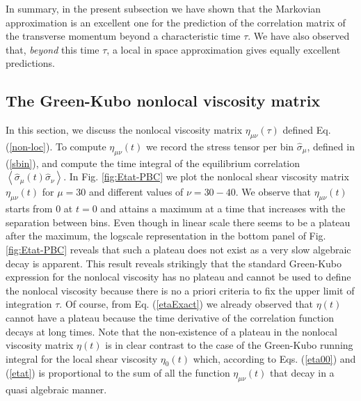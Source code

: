 \documentclass[a4paper,openright,12pt]{book}
\newcommand{\llangle}{\left\langle}
\newcommand{\rrangle}{\right\rangle}
\begin{document}
In summary, in the present subsection we have shown that the Markovian
approximation  is  an   excellent  one  for  the   prediction  of  the
correlation matrix of the  transverse momentum beyond a characteristic
time $\tau$.   We have also  observed that, \textit{beyond}  this time
$\tau$,  a  local  in  space  approximation  gives  equally  excellent
predictions.




\subsection{The Green-Kubo nonlocal viscosity matrix}
In   this  section,   we  discuss   the  nonlocal   viscosity  matrix
$\eta_{\mu\nu}(\tau)$  defined   Eq.   (\ref{non-loc}).    To  compute
$\eta_{\mu\nu}(t)$   we    record   the   stress   tensor    per   bin
$\hat{\sigma}_\mu$,  defined in  (\ref{sbin}),  and  compute the  time
integral     of     the      equilibrium     correlation     $\llangle
\hat{\sigma}_{\mu}(t)\hat{\sigma}_\nu\rrangle$.         In        Fig.
\ref{fig:Etat-PBC}  we  plot  the nonlocal  shear  viscosity
matrix  $\eta_{\mu\nu}(t)$  for  $\mu=30$   and  different  values  of
$\nu=30-40$.   We observe  that  $\eta_{\mu\nu}(t)$ starts  from 0  at
$t=0$  and  attains a  maximum  at  a  time  that increases  with  the
separation between bins. Even though in linear scale there seems to be
a plateau after the maximum, the logscale representation in the bottom
panel of Fig.  \ref{fig:Etat-PBC} reveals that such a plateau
does  not exist  as a  very slow  algebraic decay  is apparent.   This
result reveals strikingly that  the standard Green-Kubo expression for
the nonlocal  viscosity has no plateau  and cannot be used  to define
the nonlocal viscosity  because there is no a priori  criteria to fix
the  upper  limit   of  integration  $\tau$.   Of   course,  from  Eq.
(\ref{etaExact})  we already  observed  that $\eta(t)$  cannot have  a
plateau because the time derivative of the correlation function decays
at  long times.   Note  that the  non-existence of  a  plateau in  the
nonlocal viscosity matrix $\eta(t)$ is  in clear contrast to the case
of  the Green-Kubo  running  integral for  the  local shear  viscosity
$\eta_0(t)$ which,  according to Eqs.  (\ref{eta00})  and (\ref{etat})
is proportional to the sum of all the function $\eta_{\mu\nu}(t)$ that
decay  in a  quasi  algebraic  manner. 
\end{document}
